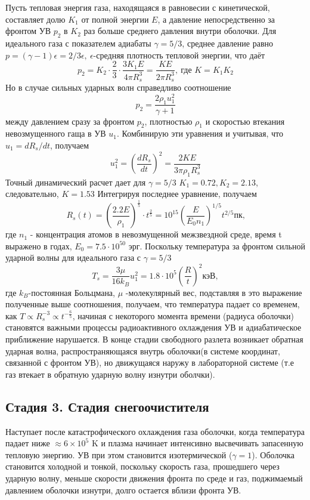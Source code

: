 \documentclass[a4paper,12pt]{extarticle}
\begin{document}
Пусть тепловая энергия газа, находящаяся в равновесии с кинетической, составляет долю $K_1$ от полной энергии $E$, а давление непосредственно за фронтом УВ $p_2$ в $K_2$ раз больше среднего давления внутри оболочки. Для идеального газа с показателем адиабаты $\gamma=5/3$, среднее давление равно $p=(\gamma-1)\epsilon=2/3\epsilon,\  \epsilon$-средняя плотность тепловой энергии, что даёт 
$$p_2=K_2\cdot \frac{2}{3}\cdot \frac{3K_1E}{4\pi R_s^3}=\frac{KE}{2\pi R_s^3},\ \text{где } K=K_1K_2$$
Но в случае сильных ударных волн справедливо соотношение
$$p_2=\frac{2\rho_1u_1^2}{\gamma+1}$$
между давлением сразу за фронтом $p_2$, плотностью $\rho_1$ и скоростью втекания невозмущенного гаща в УВ $u_1$. Комбинирую эти уравнения и учитывая, что $u_1=dR_s/dt$, получаем $$u_1^2=\left(\frac{dR_s}{dt}\right)^2=\frac{2KE}{3\pi \rho_1 R_s^3}$$
Точный динамический расчет дает для $\gamma=5/3$ $K_1=0.72,K_2=2.13$, следовательно, $K=1.53$
Интегрируя последнее уравнение, получаем 
$$R_s(t)=\left(\frac{2.2E}{\rho_1}\right)^{\frac{1}{5}}\cdot t^{\frac{2}{5}}=10^{15} \left(\frac{E}{E_0 n_1}\right)^{1/5} t^{2/5} \text{пк,}$$
где $n_1$ - концентрация атомов в невозмущенной межзвездной среде, время t выражено в годах, $E_0 = 7.5\cdot10^{50}$ эрг.
Поскольку температура за фронтом сильной ударной волны для идеального газа с $\gamma=5/3$
$$T_s = \frac{3\mu}{16k_B}u_1^2=1.8\cdot 10^5 \left(\frac{R}{t} \right)^2\text{кэВ},$$
где $k_B$-постоянная Больцмана, $\mu$ -молекулярный вес,
подставляя в это выражение полученные выше соотношения, получаем, что температура падает со временем, как 
$T \propto R_s^{-3} \propto t^{-\frac{6}{5}}$, начиная с некоторого момента времени (радиуса оболочки) становятся важными процессы радиоактивного охлаждения УВ и адиабатическое приближение нарушается. 
В конце стадии свободного разлета возникает обратная ударная волна, распространяющаяся внутрь оболочки(в системе координат, связанной с фронтом УВ), но движущаяся наружу в лабораторной системе (т.е газ втекает в обратную ударную волну изнутри оболчки). 

\subsection{Стадия 3. Стадия снегоочистителя}
Наступает после катастрофического охлаждения газа оболочки, когда температура падает ниже $\approx 6\times 10^5$ K и плазма начинает интенсивно высвечивать запасенную тепловую энергию. УВ при этом становится изотермической ($\gamma=1$). 
Оболочка становится холодной и тонкой, поскольку скорость газа, прошедшего через ударную волну, меньше скорости движения фронта по среде и газ, поджимаемый давлением оболочки изнутри, долго остается вблизи фронта УВ.
\end{document}
